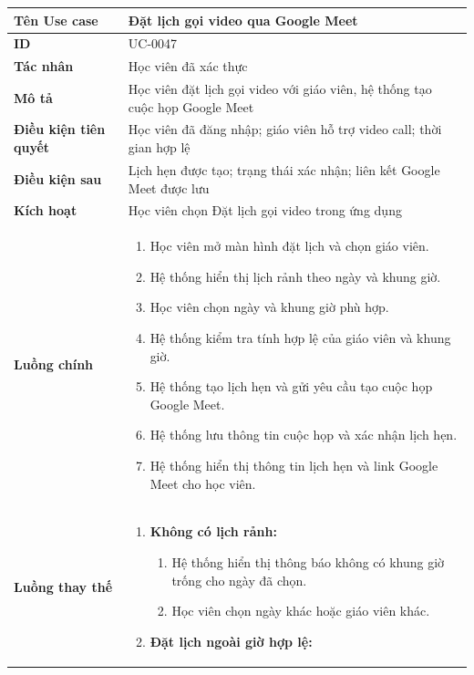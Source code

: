 {
\renewcommand{\arraystretch}{1.5}

\begin{tabularx}{\textwidth}{|>{\raggedright\arraybackslash}X|>{\raggedright\arraybackslash}X|}
\hline
\textbf{Tên Use case} & Đặt lịch gọi video qua Google Meet \\
\hline
\textbf{ID} & UC-0047 \\
\hline
\textbf{Tác nhân} & Học viên đã xác thực \\
\hline
\textbf{Mô tả} & Học viên đặt lịch gọi video với giáo viên, hệ thống tạo cuộc họp Google Meet \\
\hline
\textbf{Điều kiện tiên quyết} & Học viên đã đăng nhập; giáo viên hỗ trợ video call; thời gian hợp lệ \\
\hline
\textbf{Điều kiện sau} & Lịch hẹn được tạo; trạng thái xác nhận; liên kết Google Meet được lưu \\
\hline
\textbf{Kích hoạt} & Học viên chọn Đặt lịch gọi video trong ứng dụng \\
\hline
\textbf{Luồng chính} &
\begin{enumerate}
    \item Học viên mở màn hình đặt lịch và chọn giáo viên.
    \item Hệ thống hiển thị lịch rảnh theo ngày và khung giờ.
    \item Học viên chọn ngày và khung giờ phù hợp.
    \item Hệ thống kiểm tra tính hợp lệ của giáo viên và khung giờ.
    \item Hệ thống tạo lịch hẹn và gửi yêu cầu tạo cuộc họp Google Meet.
    \item Hệ thống lưu thông tin cuộc họp và xác nhận lịch hẹn.
    \item Hệ thống hiển thị thông tin lịch hẹn và link Google Meet cho học viên.
\end{enumerate} \\
\hline
\textbf{Luồng thay thế} &
\begin{enumerate}
    \item \textbf{Không có lịch rảnh:}
    \begin{enumerate}
        \item[2A.] Hệ thống hiển thị thông báo không có khung giờ trống cho ngày đã chọn.
        \item[3A.] Học viên chọn ngày khác hoặc giáo viên khác.
    \end{enumerate}
    \item \textbf{Đặt lịch ngoài giờ hợp lệ:}

\end{enumerate}
\end{tabularx}}
